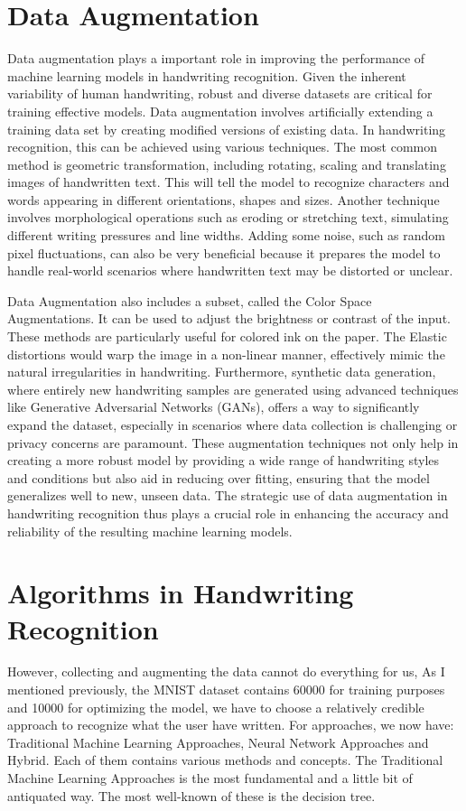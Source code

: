 \documentclass[12pt]{article}
\begin{document}
\section* {Data Augmentation}
Data augmentation plays a important role in improving the performance of machine learning models in handwriting recognition. Given the inherent variability of human handwriting, robust and diverse datasets are critical for training effective models. Data augmentation involves artificially extending a training data set by creating modified versions of existing data. In handwriting recognition, this can be achieved using various techniques. The most common method is geometric transformation, including rotating, scaling and translating images of handwritten text. This will tell the model to recognize characters and words appearing in different orientations, shapes and sizes. Another technique involves morphological operations such as eroding or stretching text, simulating different writing pressures and line widths. Adding some noise, such as random pixel fluctuations, can also be very beneficial because it prepares the model to handle real-world scenarios where handwritten text may be distorted or unclear.

Data Augmentation also includes a subset, called the Color Space Augmentations. It can be used to adjust the brightness or contrast of the input. These methods are particularly useful for colored ink on the paper. The Elastic distortions would warp the image in a non-linear manner, effectively mimic the natural irregularities in handwriting. Furthermore, synthetic data generation, where entirely new handwriting samples are generated using advanced techniques like Generative Adversarial Networks (GANs), offers a way to significantly expand the dataset, especially in scenarios where data collection is challenging or privacy concerns are paramount. These augmentation techniques not only help in creating a more robust model by providing a wide range of handwriting styles and conditions but also aid in reducing over fitting, ensuring that the model generalizes well to new, unseen data. The strategic use of data augmentation in handwriting recognition thus plays a crucial role in enhancing the accuracy and reliability of the resulting machine learning models.

\section* {Algorithms in Handwriting Recognition}
However, collecting and augmenting the data cannot do everything for us, As I mentioned previously, the MNIST dataset contains 60000 for training purposes and 10000 for optimizing the model, we have to choose a relatively credible approach to recognize what the user have written. For approaches, we now have: Traditional Machine Learning Approaches, Neural Network Approaches and Hybrid. Each of them contains various methods and concepts. The Traditional Machine Learning Approaches is the most fundamental and a little bit of antiquated way. The most well-known of these is the decision tree. 
\end{document}
